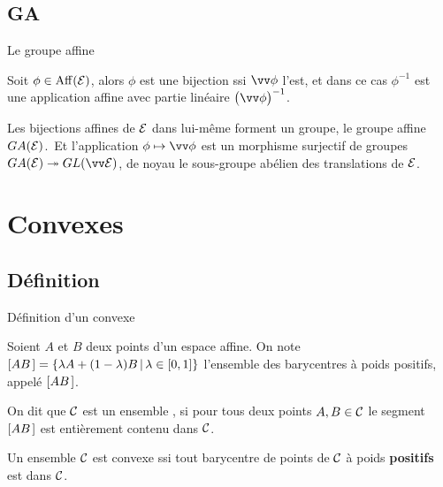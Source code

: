 \documentclass[bigger]{m53beamer}
\begin{document}
\subsection{GA}
  \begin{frame}{Le groupe affine}
    \begin{proposition}
      Soit $\phi\in\operatorname{Aff}(\mathcal{E})$, alors $\phi$ est une bijection ssi $\vv\phi$ l'est, et dans ce cas $\phi^{-1}$ est une application affine avec partie linéaire $\big(\vv\phi\big)^{-1}$.
    \end{proposition}\pause
    \begin{proposition}
      Les bijections affines de $\mathcal{E}$ dans lui-même forment un groupe, le groupe affine $GA(\mathcal{E})$.\pause\ Et l'application $\phi\mapsto\vv\phi$ est un morphisme surjectif de groupes $GA(\ens{E})\twoheadrightarrow GL(\ev{E})$\pause, de noyau le sous-groupe abélien des translations de $\mathcal{E}$.
    \end{proposition}
  \end{frame}
\section{Convexes}
\subsection{Définition}
\begin{frame}{Définition d'un convexe}
  \begin{definition}
    Soient $A$ et $B$ deux points d'un espace affine. On note $[{AB}\kern.14em]=\left\{\lambda A + (1-\lambda)B\,|\, \lambda \in [0,1]\right\}$ l'ensemble des barycentres à poids positifs, appelé  $[{AB}\kern.14em]$.
  \end{definition}\pause
  \begin{definition}
    On dit que $\mathcal{C}$ est un ensemble , si pour tous deux points $A,B \in \mathcal{C}$ le segment $[{AB}\kern.14em]$ est entièrement contenu dans $\mathcal{C}$.
  \end{definition}\pause
  \begin{proposition}
    Un ensemble $\mathcal{C}$ est convexe ssi tout barycentre de points de $\mathcal{C}$ à poids \textbf{positifs} est dans $\mathcal{C}$.
  \end{proposition}
\end{frame}
\end{document}
